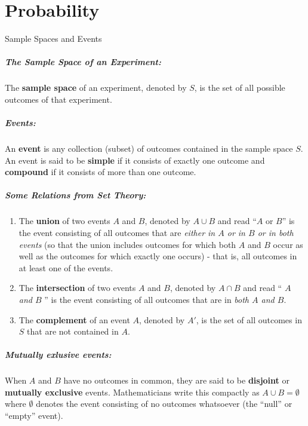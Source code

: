\documentclass[a4paper]{report}
\begin{document}
\chapter{Probability}

\begin{section}{Sample Spaces and Events}

\paragraph{The Sample Space of an Experiment:} The \textbf{sample space} of an
experiment, denoted by $S$, is the set of all possible outcomes of that
experiment.

\paragraph{Events:} An \textbf{event} is any collection (subset) of outcomes
contained in the sample space $S$. An event is said to be \textbf{simple} if it
consists of exactly one outcome and \textbf{compound} if it consists of more
than one outcome.

\paragraph{Some Relations from Set Theory:}

\begin{enumerate}
  \item The \textbf{union} of two events $A$ and $B$, denoted by $A\cup B$ and
    read ``$A$ or $B$'' is the event consisting of all outcomes that are
    \textit{either in $A$ or in $B$ or in both events} (so that the union
    includes outcomes for which both $A$ and $B$ occur as well as the outcomes
    for which exactly one occurs) - that is, all outcomes in at least one of
    the events.
  \item The \textbf{intersection} of two events $A$ and $B$, denoted by $A \cap
    B$ and read `` \textit{$A$ and $B$} '' is the event consisting of all
    outcomes that are in \textit{both $A$ and $B$}.
  \item The \textbf{complement} of an event $A$, denoted by $A'$, is the set of
    all outcomes in $S$ that are not contained in $A$.
\end{enumerate}

\paragraph{Mutually exlusive events:}

When $A$ and $B$ have no outcomes in common, they are said to be
\textbf{disjoint} or \textbf{mutually exclusive} events.  Mathematicians write
this compactly as $A \cup B = \emptyset$ where $\emptyset$ denotes the event
consisting of no outcomes whatsoever (the ``null'' or ``empty'' event).

\end{section}
\end{document}
